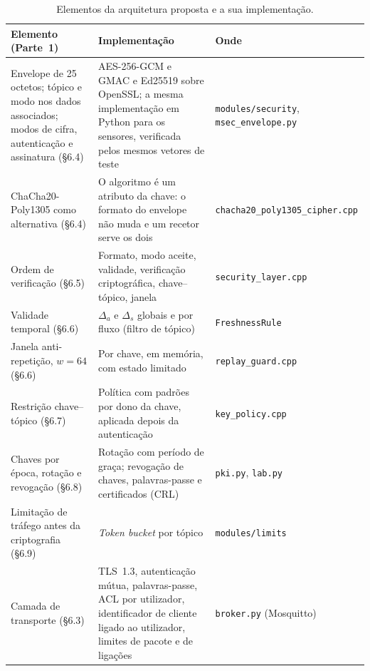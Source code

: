 \begin{table}[ht]
  \centering
  \caption{Elementos da arquitetura proposta e a sua implementação.}
  \label{tab:implementado}
  \footnotesize
  \begin{tabularx}{\textwidth}{@{}L{4.6cm}YL{4.2cm}@{}}
    \toprule
    \textbf{Elemento (Parte~1)} & \textbf{Implementação} & \textbf{Onde} \\
    \midrule
    Envelope de 25 octetos; tópico e modo nos dados associados; modos de cifra,
      autenticação e assinatura (§6.4) & AES-256-GCM e GMAC e Ed25519
      sobre OpenSSL;
      a mesma implementação em Python para os sensores, verificada pelos mesmos
      vetores de teste & \texttt{modules/security}, \texttt{msec\_envelope.py} \\
    ChaCha20-Poly1305 como alternativa (§6.4) & O algoritmo é um atributo da chave:
      o formato do envelope não muda e um recetor serve os dois & \texttt{chacha20\_poly1305\_}\allowbreak\texttt{cipher.cpp} \\
    Ordem de verificação (§6.5) & Formato, modo aceite, validade, verificação
      criptográfica, chave--tópico, janela & \texttt{security\_layer.cpp} \\
    Validade temporal (§6.6) & $\Delta_a$ e $\Delta_s$ globais e por fluxo (filtro
      de tópico) & \texttt{FreshnessRule} \\
    Janela anti-repetição, $w = 64$ (§6.6) & Por chave, em memória, com estado
      limitado & \texttt{replay\_guard.cpp} \\
    Restrição chave--tópico (§6.7) & Política com padrões por dono da chave,
      aplicada depois da autenticação & \texttt{key\_policy.cpp} \\
    Chaves por época, rotação e revogação (§6.8) & Rotação com período de graça;
      revogação de chaves, palavras-passe e certificados (CRL) & \texttt{pki.py}, \texttt{lab.py} \\
    Limitação de tráfego antes da criptografia (§6.9) & \emph{Token bucket} por
      tópico & \texttt{modules/limits} \\
    Camada de transporte (§6.3) & TLS~1.3, autenticação mútua, palavras-passe,
      ACL por utilizador, identificador de cliente ligado ao utilizador, limites de
      pacote e de ligações & \texttt{broker.py} (Mosquitto) \\
    \bottomrule
  \end{tabularx}
\end{table}

